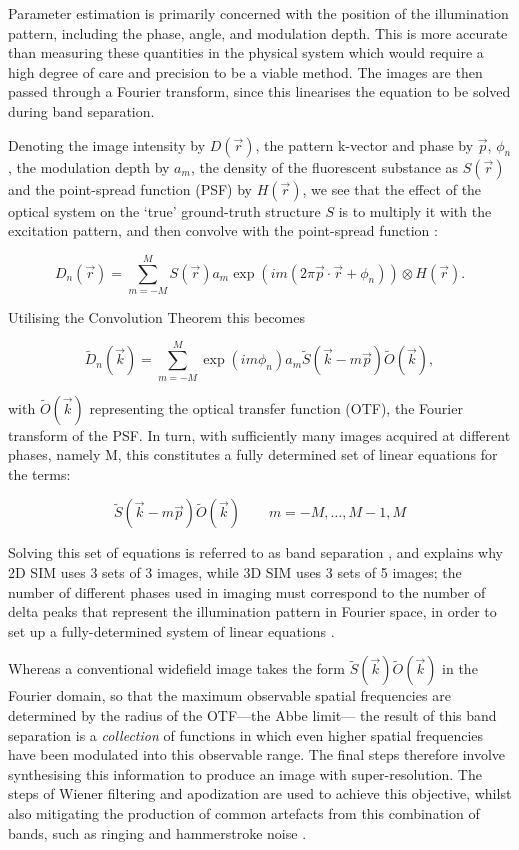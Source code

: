 \documentclass[12pt]{article}
\begin{document}
Parameter estimation is primarily concerned with the position of the illumination pattern,
including the phase, angle, and modulation depth.
This is more accurate than measuring these quantities in the physical system which would require a high degree of care and precision to be a viable method.
The images are then passed through a Fourier transform,
since this linearises the equation to be solved during band separation.

Denoting the image intensity by $D(\vec{r})$, the pattern k-vector and phase by $\vec{p}$, $\phi_n$,
the modulation depth by $a_m$, the density of the fluorescent substance as $S(\vec{r})$ and the point-spread function (PSF) by $H(\vec{r})$,
we see that the effect of the optical system on the `true' ground-truth structure $S$ is to multiply it with the excitation pattern,
and then convolve with the point-spread function \cite{originalSIM}:

\[D_n(\vec{r}) = \sum_{m=-M}^{M}{S(\vec{r})a_m\exp(im(2\pi\vec{p}\cdot\vec{r}+\phi_n))\otimes H(\vec{r})}.\]

Utilising the Convolution Theorem \cite{convthm} this becomes

\[\tilde{D}_n(\vec{k}) = \sum_{m=-M}^{M}{\exp(im\phi_n)a_m\tilde{S}(\vec{k}-m\vec{p})\tilde{O}(\vec{k})},\]

with $\tilde{O}(\vec{k})$ representing the optical transfer function (OTF), the Fourier transform of the PSF.
In turn, with sufficiently many images acquired at different phases, namely M, this constitutes a fully determined set of linear equations for the terms:

\[\tilde{S}(\vec{k}-m\vec{p})\tilde{O}(\vec{k})\qquad m=-M,\dots,M-1,M\]

Solving this set of equations is referred to as band separation \cite{originalSIM},
and explains why 2D SIM uses 3 sets of 3 images, while 3D SIM uses 3 sets of 5 images;
the number of different phases used in imaging must correspond to the number of delta peaks that represent the illumination pattern in Fourier space,
in order to set up a fully-determined system of linear equations \cite{params}.

Whereas a conventional widefield image takes the form $\tilde{S}(\vec{k})\tilde{O}(\vec{k})$ in the Fourier domain,
so that the maximum observable spatial frequencies are determined by the radius of the OTF---the Abbe limit---
the result of this band separation is a \textit{collection} of functions in which even higher spatial frequencies have been modulated into this observable range.
The final steps therefore involve synthesising this information to produce an image with super-resolution.
The steps of Wiener filtering and apodization are used to achieve this objective,
whilst also mitigating the production of common artefacts from this combination of bands,
such as ringing and hammerstroke noise \cite{params}.
\end{document}
